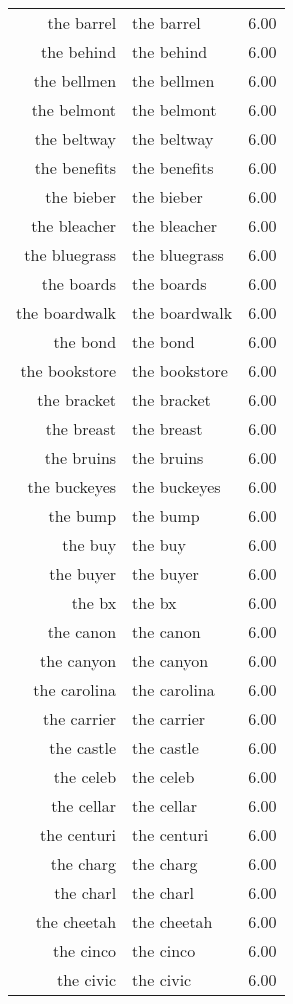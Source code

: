 \begin{table}[ht]
\begin{tabular}{rlr}
  the barrel & the barrel & 6.00 \\ 
  the behind & the behind & 6.00 \\ 
  the bellmen & the bellmen & 6.00 \\ 
  the belmont & the belmont & 6.00 \\ 
  the beltway & the beltway & 6.00 \\ 
  the benefits & the benefits & 6.00 \\ 
  the bieber & the bieber & 6.00 \\ 
  the bleacher & the bleacher & 6.00 \\ 
  the bluegrass & the bluegrass & 6.00 \\ 
  the boards & the boards & 6.00 \\ 
  the boardwalk & the boardwalk & 6.00 \\ 
  the bond & the bond & 6.00 \\ 
  the bookstore & the bookstore & 6.00 \\ 
  the bracket & the bracket & 6.00 \\ 
  the breast & the breast & 6.00 \\ 
  the bruins & the bruins & 6.00 \\ 
  the buckeyes & the buckeyes & 6.00 \\ 
  the bump & the bump & 6.00 \\ 
  the buy & the buy & 6.00 \\ 
  the buyer & the buyer & 6.00 \\ 
  the bx & the bx & 6.00 \\ 
  the canon & the canon & 6.00 \\ 
  the canyon & the canyon & 6.00 \\ 
  the carolina & the carolina & 6.00 \\ 
  the carrier & the carrier & 6.00 \\ 
  the castle & the castle & 6.00 \\ 
  the celeb & the celeb & 6.00 \\ 
  the cellar & the cellar & 6.00 \\ 
  the centuri & the centuri & 6.00 \\ 
  the charg & the charg & 6.00 \\ 
  the charl & the charl & 6.00 \\ 
  the cheetah & the cheetah & 6.00 \\ 
  the cinco & the cinco & 6.00 \\ 
  the civic & the civic & 6.00 \\ 

\end{tabular}
\end{table}

